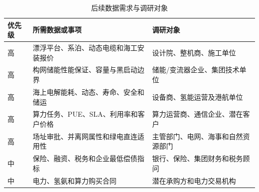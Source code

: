 \begin{table}[H]
\centering
\caption{后续数据需求与调研对象}
\label{tab:c6-calibration}
\small
\begin{tabularx}{\textwidth}{p{1.5cm} X X}
\toprule
优先级 & 所需数据或事项 & 调研对象\\
\midrule
高 & 漂浮平台、系泊、动态电缆和海工安装报价 & 设计院、整机商、施工单位\\
高 & 构网储能性能保证、容量与黑启动边界 & 储能/变流器企业、集团技术单位\\
高 & 海上电解能耗、动态、寿命、安全和储运 & 设备商、氢能运营及港航单位\\
高 & 算力任务、PUE、SLA、利用率和客户价格 & 算力运营商、通信企业、潜在客户\\
高 & 场址审批、并离网属性和绿电直连适用性 & 主管部门、电网、海事和自然资源部门\\
中 & 保险、融资、税务和企业最低偿债指标 & 银行、保险、集团财务和税务顾问\\
中 & 电力、氢氨和算力购买合同 & 潜在承购方和电力交易机构\\
\bottomrule
\end{tabularx}
\end{table}

